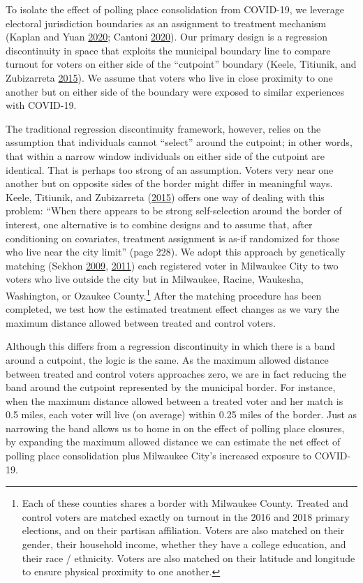 \documentclass[
  12pt,
]{article}
\begin{document}
To isolate the effect of polling place consolidation from COVID-19, we leverage electoral jurisdiction boundaries as an assignment to treatment mechanism (Kaplan and Yuan \protect\hyperlink{ref-Kaplan2020}{2020}; Cantoni \protect\hyperlink{ref-Cantoni2020}{2020}). Our primary design is a regression discontinuity in space that exploits the municipal boundary line to compare turnout for voters on either side of the ``cutpoint'' boundary (Keele, Titiunik, and Zubizarreta \protect\hyperlink{ref-Keele2015}{2015}). We assume that voters who live in close proximity to one another but on either side of the boundary were exposed to similar experiences with COVID-19.

The traditional regression discontinuity framework, however, relies on the assumption that individuals cannot ``select'' around the cutpoint; in other words, that within a narrow window individuals on either side of the cutpoint are identical. That is perhaps too strong of an assumption. Voters very near one another but on opposite sides of the border might differ in meaningful ways. Keele, Titiunik, and Zubizarreta (\protect\hyperlink{ref-Keele2015}{2015}) offers one way of dealing with this problem: ``When there appears to be strong self-selection around the border of interest, one alternative is to combine designs and to assume that, after conditioning on covariates, treatment assignment is as-if randomized for those who live near the city limit'' (page 228). We adopt this approach by genetically matching (Sekhon \protect\hyperlink{ref-Sekhon2009}{2009}, \protect\hyperlink{ref-Sekhon2011}{2011}) each registered voter in Milwaukee City to two voters who live outside the city but in Milwaukee, Racine, Waukesha, Washington, or Ozaukee County.\footnote{Each of these counties shares a border with Milwaukee County. Treated and control voters are matched exactly on turnout in the 2016 and 2018 primary elections, and on their partisan affiliation. Voters are also matched on their gender, their household income, whether they have a college education, and their race / ethnicity. Voters are also matched on their latitude and longitude to ensure physical proximity to one another.} After the matching procedure has been completed, we test how the estimated treatment effect changes as we vary the maximum distance allowed between treated and control voters.

Although this differs from a regression discontinuity in which there is a band around a cutpoint, the logic is the same. As the maximum allowed distance between treated and control voters approaches zero, we are in fact reducing the band around the cutpoint represented by the municipal border. For instance, when the maximum distance allowed between a treated voter and her match is 0.5 miles, each voter will live (on average) within 0.25 miles of the border. Just as narrowing the band allows us to home in on the effect of polling place closures, by expanding the maximum allowed distance we can estimate the net effect of polling place consolidation plus Milwaukee City's increased exposure to COVID-19.
\end{document}
